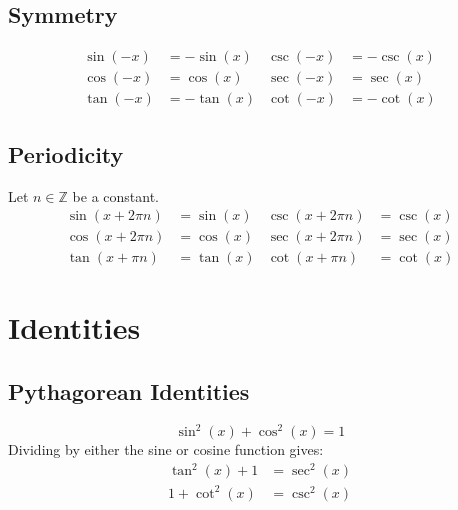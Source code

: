 \documentclass{article}
\begin{document}
\subsection{Symmetry}
\begin{align*}
        \sin{\left( -x \right)} &= -\sin{\left( x \right)} & \csc{\left( -x \right)} &= -\csc{\left( x \right)} \\
        \cos{\left( -x \right)} &=  \cos{\left( x \right)} & \sec{\left( -x \right)} &=  \sec{\left( x \right)} \\
        \tan{\left( -x \right)} &= -\tan{\left( x \right)} & \cot{\left( -x \right)} &= -\cot{\left( x \right)}
\end{align*}
\subsection{Periodicity}
Let $n\in\mathbb{Z}$ be a constant.
\begin{align*}
    \sin{\left( x+2\pi n \right)} &= \sin{\left( x \right)} & \csc{\left( x+2\pi n \right)} &= \csc{\left( x \right)} \\
    \cos{\left( x+2\pi n \right)} &= \cos{\left( x \right)} & \sec{\left( x+2\pi n \right)} &= \sec{\left( x \right)} \\
    \tan{\left( x+\pi n \right)}  &= \tan{\left( x \right)} & \cot{\left( x+\pi n \right)}  &= \cot{\left( x \right)}
\end{align*}
\section{Identities}
\subsection{Pythagorean Identities}
\begin{equation*}
	\sin^2{\left( x \right)} + \cos^2{\left( x \right)} = 1
\end{equation*}
Dividing by either the sine or cosine function gives:
\begin{align*}
	\tan^2{\left( x \right)} + 1 &= \sec^2{\left( x \right)} \\
	1 + \cot^2{\left( x \right)} &= \csc^2{\left( x \right)}
\end{align*}
\end{document}
